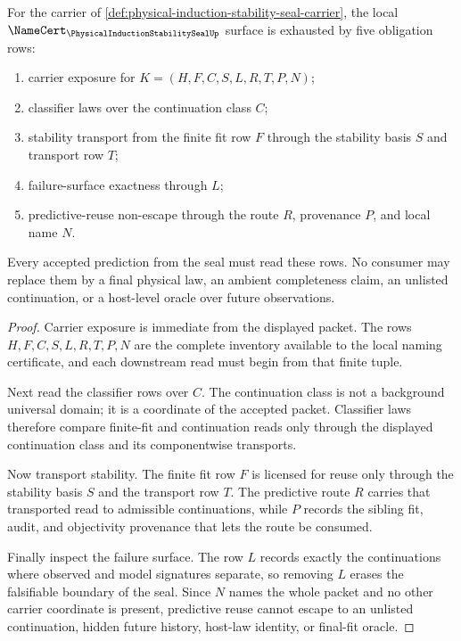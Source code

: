 \begin{theorem}
\label{thm:physical-induction-stability-seal-namecert-obligations}
For the carrier of \autoref{def:physical-induction-stability-seal-carrier}, the local $\NameCert_{\PhysicalInductionStabilitySealUp}$ surface is exhausted by five obligation rows:
\begin{enumerate}
\item carrier exposure for $K=(H,F,C,S,L,R,T,P,N)$;
\item classifier laws over the continuation class $C$;
\item stability transport from the finite fit row $F$ through the stability basis $S$ and transport row $T$;
\item failure-surface exactness through $L$;
\item predictive-reuse non-escape through the route $R$, provenance $P$, and local name $N$.
\end{enumerate}
Every accepted prediction from the seal must read these rows. No consumer may replace them by a final physical law, an ambient completeness claim, an unlisted continuation, or a host-level oracle over future observations.
\end{theorem}
\begin{proof}
Carrier exposure is immediate from the displayed packet. The rows $H,F,C,S,L,R,T,P,N$ are the complete inventory available to the local naming certificate, and each downstream read must begin from that finite tuple.

Next read the classifier rows over $C$. The continuation class is not a background universal domain; it is a coordinate of the accepted packet. Classifier laws therefore compare finite-fit and continuation reads only through the displayed continuation class and its componentwise transports.

Now transport stability. The finite fit row $F$ is licensed for reuse only through the stability basis $S$ and the transport row $T$. The predictive route $R$ carries that transported read to admissible continuations, while $P$ records the sibling fit, audit, and objectivity provenance that lets the route be consumed.

Finally inspect the failure surface. The row $L$ records exactly the continuations where observed and model signatures separate, so removing $L$ erases the falsifiable boundary of the seal. Since $N$ names the whole packet and no other carrier coordinate is present, predictive reuse cannot escape to an unlisted continuation, hidden future history, host-law identity, or final-fit oracle.
\end{proof}

